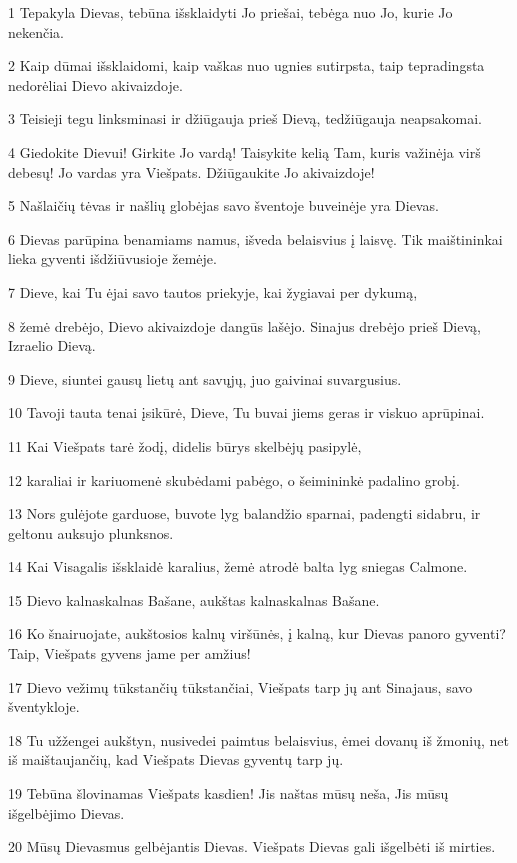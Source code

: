 \par 1 Tepakyla Dievas, tebūna išsklaidyti Jo priešai, tebėga nuo Jo, kurie Jo nekenčia. 
\par 2 Kaip dūmai išsklaidomi, kaip vaškas nuo ugnies sutirpsta, taip tepradingsta nedorėliai Dievo akivaizdoje. 
\par 3 Teisieji tegu linksminasi ir džiūgauja prieš Dievą, tedžiūgauja neapsakomai. 
\par 4 Giedokite Dievui! Girkite Jo vardą! Taisykite kelią Tam, kuris važinėja virš debesų! Jo vardas yra Viešpats. Džiūgaukite Jo akivaizdoje! 
\par 5 Našlaičių tėvas ir našlių globėjas savo šventoje buveinėje yra Dievas. 
\par 6 Dievas parūpina benamiams namus, išveda belaisvius į laisvę. Tik maištininkai lieka gyventi išdžiūvusioje žemėje. 
\par 7 Dieve, kai Tu ėjai savo tautos priekyje, kai žygiavai per dykumą, 
\par 8 žemė drebėjo, Dievo akivaizdoje dangūs lašėjo. Sinajus drebėjo prieš Dievą, Izraelio Dievą. 
\par 9 Dieve, siuntei gausų lietų ant savųjų, juo gaivinai suvargusius. 
\par 10 Tavoji tauta tenai įsikūrė, Dieve, Tu buvai jiems geras ir viskuo aprūpinai. 
\par 11 Kai Viešpats tarė žodį, didelis būrys skelbėjų pasipylė, 
\par 12 karaliai ir kariuomenė skubėdami pabėgo, o šeimininkė padalino grobį. 
\par 13 Nors gulėjote garduose, buvote lyg balandžio sparnai, padengti sidabru, ir geltonu auksu­jo plunksnos. 
\par 14 Kai Visagalis išsklaidė karalius, žemė atrodė balta lyg sniegas Calmone. 
\par 15 Dievo kalnas­kalnas Bašane, aukštas kalnas­kalnas Bašane. 
\par 16 Ko šnairuojate, aukštosios kalnų viršūnės, į kalną, kur Dievas panoro gyventi? Taip, Viešpats gyvens jame per amžius! 
\par 17 Dievo vežimų tūkstančių tūkstančiai, Viešpats tarp jų ant Sinajaus, savo šventykloje. 
\par 18 Tu užžengei aukštyn, nusivedei paimtus belaisvius, ėmei dovanų iš žmonių, net iš maištaujančių, kad Viešpats Dievas gyventų tarp jų. 
\par 19 Tebūna šlovinamas Viešpats kasdien! Jis naštas mūsų neša, Jis mūsų išgelbėjimo Dievas. 
\par 20 Mūsų Dievas­mus gelbėjantis Dievas. Viešpats Dievas gali išgelbėti iš mirties. 
